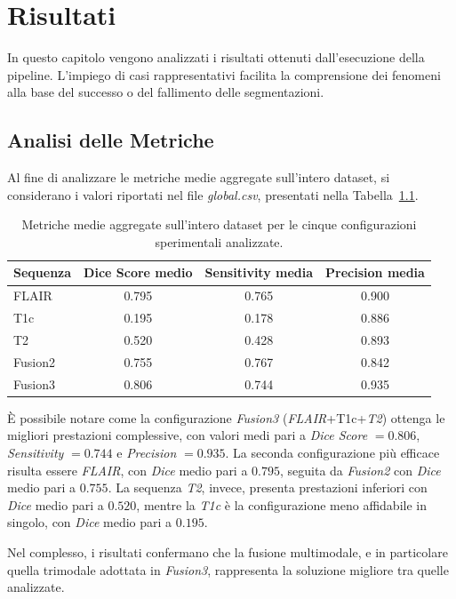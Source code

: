 \chapter{Risultati}
In questo capitolo vengono analizzati i risultati ottenuti dall’esecuzione della pipeline. L'impiego di casi rappresentativi facilita la comprensione dei fenomeni alla base del successo o del fallimento delle segmentazioni.

\section{Analisi delle Metriche}
Al fine di analizzare le metriche medie aggregate sull’intero dataset, si considerano i valori riportati nel file \textit{global.csv}, presentati nella Tabella~\ref{tab:global_metrics}.

\begin{table}[H]
\centering
\caption{Metriche medie aggregate sull’intero dataset per le cinque configurazioni sperimentali analizzate.}
\label{tab:global_metrics}
\begin{tabular}{lccc}
\hline
\textbf{Sequenza} & \textbf{Dice Score medio} & \textbf{Sensitivity media} & \textbf{Precision media} \\
\hline
FLAIR & 0.795 & 0.765 & 0.900 \\
T1c & 0.195 & 0.178 & 0.886 \\
T2 & 0.520 & 0.428 & 0.893 \\
Fusion2 & 0.755 & 0.767 & 0.842 \\
Fusion3 & 0.806 & 0.744 & 0.935 \\
\hline
\end{tabular}
\end{table}

È possibile notare come la configurazione \textit{Fusion3} (\textit{FLAIR}+T1c+\textit{T2}) ottenga le migliori prestazioni complessive, con valori medi pari a \textit{Dice Score} \(= 0.806\), \textit{Sensitivity} \(= 0.744\) e \textit{Precision} \(= 0.935\).
La seconda configurazione più efficace risulta essere \textit{FLAIR}, con \textit{Dice} medio pari a \(0.795\), seguita da \textit{Fusion2} con \textit{Dice} medio pari a \(0.755\). La sequenza \textit{T2}, invece, presenta prestazioni inferiori con \textit{Dice} medio pari a \(0.520\), mentre la \textit{T1c} è la configurazione meno affidabile in singolo, con \textit{Dice} medio pari a \(0.195\).

Nel complesso, i risultati confermano che la fusione multimodale, e in particolare quella trimodale adottata in \textit{Fusion3}, rappresenta la soluzione migliore tra quelle analizzate.


